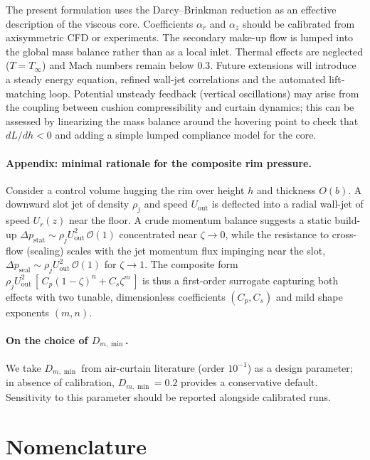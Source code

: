 \documentclass[11pt,a4paper]{article}
\begin{document}
The present formulation uses the Darcy–Brinkman reduction as an effective description of the viscous core.
Coefficients $\alpha_r$ and $\alpha_z$ should be calibrated from axisymmetric CFD or experiments.
The secondary make-up flow is lumped into the global mass balance rather than as a local inlet.
Thermal effects are neglected ($T=T_\infty$) and Mach numbers remain below 0.3.
Future extensions will introduce a steady energy equation, refined wall-jet correlations and the automated lift-matching loop.
Potential unsteady feedback (vertical oscillations) may arise from the coupling between cushion compressibility and curtain dynamics; this can be assessed by linearizing the mass balance around the hovering point to check that $dL/dh<0$ and adding a simple lumped compliance model for the core.

\paragraph{Appendix: minimal rationale for the composite rim pressure.}
Consider a control volume hugging the rim over height $h$ and thickness $O(b)$.
A downward slot jet of density $\rho_j$ and speed $U_{\mathrm{out}}$ is deflected
into a radial wall-jet of speed $U_r(z)$ near the floor. A crude momentum balance
suggests a static build-up $\Delta p_{\mathrm{stat}}\sim \rho_j U_{\mathrm{out}}^2
\,\mathcal{O}(1)$ concentrated near $\zeta\!\to\!0$, while the resistance to
cross-flow (sealing) scales with the jet momentum flux impinging near the slot,
$\Delta p_{\mathrm{seal}}\sim \rho_j U_{\mathrm{out}}^2\,\mathcal{O}(1)$ for
$\zeta\!\to\!1$. The composite form
$\rho_j U_{\mathrm{out}}^2\,[\,C_p(1-\zeta)^n + C_s \zeta^m\,]$ is thus a
first-order surrogate capturing both effects with two tunable, dimensionless
coefficients $(C_p,C_s)$ and mild shape exponents $(m,n)$.

\paragraph{On the choice of $D_{m,\min}$.}
We take $D_{m,\min}$ from air-curtain literature (order $10^{-1}$) as a design parameter; in absence of calibration, $D_{m,\min}=0.2$ provides a conservative default.
Sensitivity to this parameter should be reported alongside calibrated runs.

\section{Nomenclature}
\label{sec:nomenclature}
\end{document}
